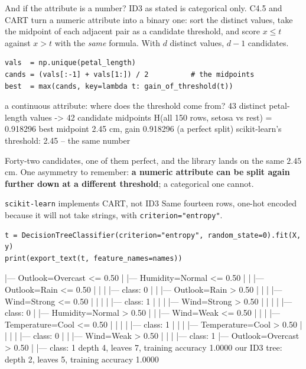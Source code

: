 \documentclass[aspectratio=169]{beamer}
\begin{document}
\begin{frame}[fragile,shrink=8]{And if the attribute is a number?}
ID3 as stated is categorical only. C4.5 and CART turn a numeric attribute
into a binary one: sort the distinct values, take the midpoint of each
adjacent pair as a candidate threshold, and score $x \le t$ against $x > t$
with the \emph{same} formula. With $d$ distinct values, $d-1$ candidates.
\begin{lstlisting}
vals  = np.unique(petal_length)
cands = (vals[:-1] + vals[1:]) / 2          # the midpoints
best  = max(cands, key=lambda t: gain_of_threshold(t))
\end{lstlisting}
\begin{outblk}
a continuous attribute: where does the threshold come from?
   43 distinct petal-length values -> 42 candidate midpoints
   H(all 150 rows, setosa vs rest) = 0.918296
   best midpoint 2.45 cm, gain 0.918296  (a perfect split)
   scikit-learn's threshold: 2.45  -- the same number
\end{outblk}
\begin{center}\small
  Forty-two candidates, one of them perfect, and the library lands on the
  same $2.45$ cm. One asymmetry to remember: \textbf{a numeric attribute can
  be split again further down at a different threshold}; a categorical one
  cannot.
\end{center}
\end{frame}

\begin{frame}[fragile,shrink=18]{\texttt{scikit-learn} implements CART, not ID3}
Same fourteen rows, one-hot encoded because it will not take strings, with
\texttt{criterion="entropy"}.
\begin{lstlisting}
t = DecisionTreeClassifier(criterion="entropy", random_state=0).fit(X, y)
print(export_text(t, feature_names=names))
\end{lstlisting}
\begin{outblk}
|--- Outlook=Overcast <= 0.50
|   |--- Humidity=Normal <= 0.50
|   |   |--- Outlook=Rain <= 0.50
|   |   |   |--- class: 0
|   |   |--- Outlook=Rain >  0.50
|   |   |   |--- Wind=Strong <= 0.50
|   |   |   |   |--- class: 1
|   |   |   |--- Wind=Strong >  0.50
|   |   |   |   |--- class: 0
|   |--- Humidity=Normal >  0.50
|   |   |--- Wind=Weak <= 0.50
|   |   |   |--- Temperature=Cool <= 0.50
|   |   |   |   |--- class: 1
|   |   |   |--- Temperature=Cool >  0.50
|   |   |   |   |--- class: 0
|   |   |--- Wind=Weak >  0.50
|   |   |   |--- class: 1
|--- Outlook=Overcast >  0.50
|   |--- class: 1
depth 4, leaves 7, training accuracy 1.0000
our ID3 tree: depth 2, leaves 5, training accuracy 1.0000
\end{outblk}
\end{frame}
\end{document}
